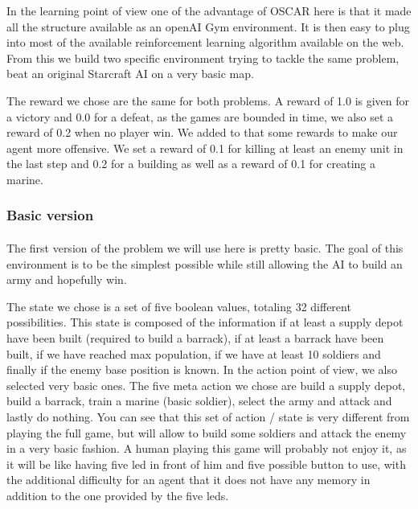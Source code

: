 \documentclass[twocolumn,a4paper,10pt]{article}
\begin{document}
In the learning point of view one of the advantage of OSCAR here is
that it made all the structure available as an openAI Gym environment.
It is then easy to plug into most of the available reinforcement learning
algorithm available on the web. From this we build two specific environment
trying to tackle the same problem, beat an original Starcraft AI on
a very basic map.

The reward we chose are the same for both problems. A reward of 1.0
is given for a victory and 0.0 for a defeat, as the games are bounded
in time, we also set a reward of 0.2 when no player win. We added
to that some rewards to make our agent more offensive. We set a reward
of 0.1 for killing at least an enemy unit in the last step and 0.2
for a building as well as a reward of 0.1 for creating a marine.

\subsubsection{Basic version}

\label{basicVersion} 

\paragraph{}

The first version of the problem we will use here is pretty basic.
The goal of this environment is to be the simplest possible while still
allowing the AI to build an army and hopefully win.

The state we chose is a set of five boolean values, totaling 32 different
possibilities. This state is composed of the information if at least
a supply depot have been built (required to build a barrack), if at
least a barrack have been built, if we have reached max population,
if we have at least 10 soldiers and finally if the enemy base position
is known. In the action point of view, we also selected very basic
ones. The five meta action we chose are build a supply depot, build
a barrack, train a marine (basic soldier), select the army and attack and lastly
do nothing. You can see that this set of action / state is very different
from playing the full game, but will allow to build some soldiers
and attack the enemy in a very basic fashion. A human playing this
game will probably not enjoy it, as it will be like having five led
in front of him and five possible button to use, with the additional
difficulty for an agent that it does not have any memory in addition
to the one provided by the five leds.
\end{document}

